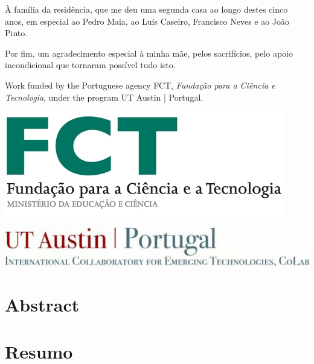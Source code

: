 \documentclass[
  oneside,
  11pt, a4paper,
  footinclude=true,
  headinclude=true,
  cleardoublepage=empty
]{scrbook}
\begin{document}
À família da residência, que me deu uma segunda casa ao longo destes cinco anos, em especial ao Pedro Maia, ao Luís Caseiro, Francisco Neves e ao João Pinto.

Por fim, um agradecimento especial à minha mãe, pelos sacrifícios, pelo apoio incondicional que tornaram possível tudo isto.

\newpage

Work funded by the Portuguese agency FCT, \textit{Fundação para a Ciência e Tecnologia}, under the program UT Austin | Portugal.

\begin{center}
\includegraphics[width=0.5\linewidth]{img/fct.jpg}
\end{center}

\begin{center}
\includegraphics[width=0.5\linewidth]{img/uta_pt.jpg}
\end{center}


	\cleardoublepage
	
\chapter*{Abstract}
	

	\cleardoublepage

\chapter*{Resumo}
	

	\cleardoublepage
	
	\setcounter{page}{3}
	\rm
	
	\cleardoublepage
	\tableofcontents
	
	\cleardoublepage
	\listoffigures
	
	\cleardoublepage
	\listoftables
	
\end{document}
